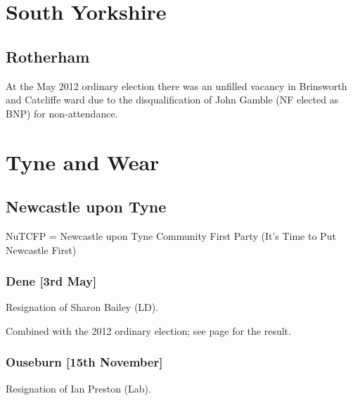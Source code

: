\documentclass[a4paper,openany]{book}
\begin{document}
\begin{resultsiii}
\section{South Yorkshire}

\subsection*{Rotherham}

At the May 2012 ordinary election there was an unfilled vacancy in Brinsworth and Catcliffe ward due to the disqualification of John Gamble (NF elected as BNP) for non-attendance.

\section{Tyne and Wear}

\subsection*{Newcastle upon Tyne}

NuTCFP = Newcastle upon Tyne Community First Party (It's Time to Put Newcastle First)

\subsubsection*{Dene \hspace*{\fill}\nolinebreak[1]%
\enspace\hspace*{\fill}
[3rd May]}


Resignation of Sharon Bailey (LD).

Combined with the 2012 ordinary election; see page \pageref{DeneNewcastleTyne} for the result.

\subsubsection*{Ouseburn \hspace*{\fill}\nolinebreak[1]%
\enspace\hspace*{\fill}
[15th November]}


Resignation of Ian Preston (Lab).


\end{resultsiii}
\end{document}
